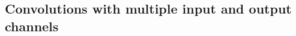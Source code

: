 \documentclass{article}
\renewcommand{\a}{\mathbf{a}}
\newcommand{\h}{\mathbf{h}}
\newcommand{\p}{\mathbf{p}}
\begin{document}

\FloatBarrier
\subsection{Convolutions with multiple input and output channels}
\end{document}
